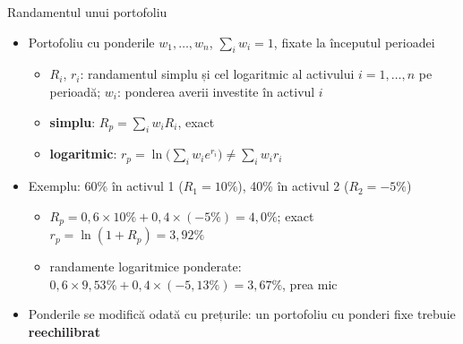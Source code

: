 \begin{frame}{Randamentul unui portofoliu}
\itemsize{\small}
\begin{itemize}
    \item Portofoliu cu ponderile $w_1, \dots, w_n$, $\sum_i w_i = 1$, fixate la începutul perioadei
    \begin{itemize}
        \item $R_i$, $r_i$: randamentul simplu și cel logaritmic al activului $i = 1, \dots, n$ pe perioadă; $w_i$: ponderea averii investite în activul $i$
        \item \textbf{simplu}: $R_p = \sum_i w_i R_i$, exact
        \item \textbf{logaritmic}: $r_p = \ln\big(\sum_i w_i e^{r_i}\big) \neq \sum_i w_i r_i$
    \end{itemize}
    \item Exemplu: 60\% în activul 1 ($R_1 = 10\%$), 40\% în activul 2 ($R_2 = -5\%$)
    \begin{itemize}
        \item $R_p = 0{,}6 \times 10\% + 0{,}4 \times (-5\%) = 4{,}0\%$; exact $r_p = \ln(1 + R_p) = 3{,}92\%$
        \item randamente logaritmice ponderate: $0{,}6 \times 9{,}53\% + 0{,}4 \times (-5{,}13\%) = 3{,}67\%$, prea mic
    \end{itemize}
    \item Ponderile se modifică odată cu prețurile: un portofoliu cu ponderi fixe trebuie \textbf{reechilibrat}
\end{itemize}
\end{frame}

